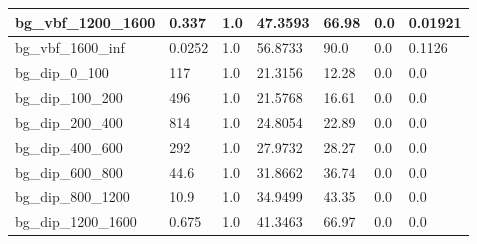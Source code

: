\documentclass[a4paper, 10pt]{article}
\begin{document}
\begin{table}[H]
\begin{center}
\begin{tabular}{|m{23.0mm}|m{23.0mm}|m{18.0mm}|m{19.0mm}|m{19.0mm}|m{19.0mm}|m{19.0mm}|}
      \hline
      {\cellcolor{white}         bg\_vbf\_1200\_1600}& {\cellcolor{white}         0.337}& {\cellcolor{white}         1.0}& {\cellcolor{white}         47.3593}& {\cellcolor{white}         66.98}& {\cellcolor{green}         0.0}& {\cellcolor{green}         0.01921}\\
      \hline
      {\cellcolor{white}         bg\_vbf\_1600\_inf}& {\cellcolor{white}         0.0252}& {\cellcolor{white}         1.0}& {\cellcolor{white}         56.8733}& {\cellcolor{white}         90.0}& {\cellcolor{green}         0.0}& {\cellcolor{green}         0.1126}\\
      \hline
      {\cellcolor{white}         bg\_dip\_0\_100}& {\cellcolor{white}         117}& {\cellcolor{white}         1.0}& {\cellcolor{white}         21.3156}& {\cellcolor{white}         12.28}& {\cellcolor{green}         0.0}& {\cellcolor{green}         0.0}\\
      \hline
      {\cellcolor{white}         bg\_dip\_100\_200}& {\cellcolor{white}         496}& {\cellcolor{white}         1.0}& {\cellcolor{white}         21.5768}& {\cellcolor{white}         16.61}& {\cellcolor{green}         0.0}& {\cellcolor{green}         0.0}\\
      \hline
      {\cellcolor{white}         bg\_dip\_200\_400}& {\cellcolor{white}         814}& {\cellcolor{white}         1.0}& {\cellcolor{white}         24.8054}& {\cellcolor{white}         22.89}& {\cellcolor{green}         0.0}& {\cellcolor{green}         0.0}\\
      \hline
      {\cellcolor{white}         bg\_dip\_400\_600}& {\cellcolor{white}         292}& {\cellcolor{white}         1.0}& {\cellcolor{white}         27.9732}& {\cellcolor{white}         28.27}& {\cellcolor{green}         0.0}& {\cellcolor{green}         0.0}\\
      \hline
      {\cellcolor{white}         bg\_dip\_600\_800}& {\cellcolor{white}         44.6}& {\cellcolor{white}         1.0}& {\cellcolor{white}         31.8662}& {\cellcolor{white}         36.74}& {\cellcolor{green}         0.0}& {\cellcolor{green}         0.0}\\
      \hline
      {\cellcolor{white}         bg\_dip\_800\_1200}& {\cellcolor{white}         10.9}& {\cellcolor{white}         1.0}& {\cellcolor{white}         34.9499}& {\cellcolor{white}         43.35}& {\cellcolor{green}         0.0}& {\cellcolor{green}         0.0}\\
      \hline
      {\cellcolor{white}         bg\_dip\_1200\_1600}& {\cellcolor{white}         0.675}& {\cellcolor{white}         1.0}& {\cellcolor{white}         41.3463}& {\cellcolor{white}         66.97}& {\cellcolor{green}         0.0}& {\cellcolor{green}         0.0}\\

\end{tabular}
\end{center}
\end{table}
\end{document}
